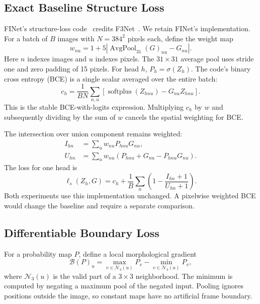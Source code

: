 \documentclass[conference,letterpaper]{IEEEtran}
\begin{document}
\subsection{Exact Baseline Structure Loss}
FINet's structure-loss code~\cite{finet} credits F3Net~\cite{f3net}. We retain FINet's implementation. For a batch of $B$ images with $N=384^2$ pixels each, define the weight map
\begin{equation}
 w_{nu}=1+5\left|
 \operatorname{AvgPool}_{31}(G)_{nu}-G_{nu}\right|.
 \label{eq:weights}
\end{equation}
Here $n$ indexes images and $u$ indexes pixels. The $31\times31$ average pool uses stride one and zero padding of 15 pixels. For head $h$, $P_h=\sigma(Z_h)$. The code's binary cross entropy (BCE) is a single scalar averaged over the entire batch:
\begin{equation}
 c_h=\frac{1}{BN}\sum_{n,u}
 \left[\operatorname{softplus}(Z_{hnu})-G_{nu}Z_{hnu}\right].
 \label{eq:basebce}
\end{equation}
This is the stable BCE-with-logits expression. Multiplying $c_h$ by $w$ and subsequently dividing by the sum of $w$ cancels the spatial weighting for BCE.

The intersection over union component remains weighted:
\begin{equation}
\begin{aligned}
 I_{hn}&=\sum_u w_{nu}P_{hnu}G_{nu},\\
 U_{hn}&=\sum_u w_{nu}
 \left(P_{hnu}+G_{nu}-P_{hnu}G_{nu}\right).
\end{aligned}
\label{eq:weighted_iou}
\end{equation}
The loss for one head is
\begin{equation}
 \ell_s(Z_h,G)=c_h+\frac{1}{B}\sum_n
 \left(1-\frac{I_{hn}+1}{U_{hn}+1}\right).
 \label{eq:structure}
\end{equation}
Both experiments use this implementation unchanged. A pixelwise weighted BCE would change the baseline and require a separate comparison.

\subsection{Differentiable Boundary Loss}
For a probability map $P$, define a local morphological gradient
\begin{equation}
 \mathcal B(P)_u=
 \max_{v\in\mathcal N_3(u)}P_v-
 \min_{v\in\mathcal N_3(u)}P_v,
 \label{eq:morph}
\end{equation}
where $\mathcal N_3(u)$ is the valid part of a $3\times3$ neighborhood. The minimum is computed by negating a maximum pool of the negated input. Pooling ignores positions outside the image, so constant maps have no artificial frame boundary.
\end{document}
